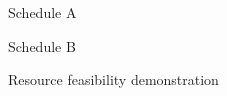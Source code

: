 \documentclass{article}
\begin{document}
\begin{figure}[ht]
	\centering
	
	\caption{Schedule A}
	\label{fig:activity_graph}
\end{figure}

\begin{figure}[ht]
	\centering
	
	\caption{Schedule B}
	\label{fig:activity_graph}
\end{figure}

\begin{figure}[ht]

	\makebox[\textwidth][c]{
		
	}
	\caption{Resource feasibility demonstration}
	\label{fig:activity_graph}
\end{figure}
\end{document}
